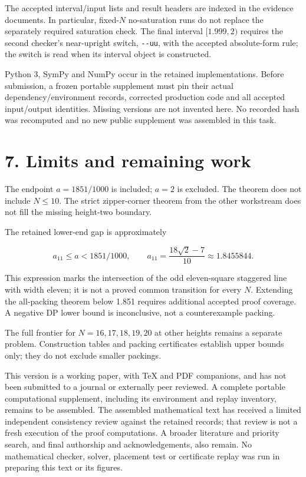 \documentclass[
  11pt,
  a4paper,
]{article}
\begin{document}
The accepted interval/input lists and result headers are indexed in the
evidence documents. In particular, fixed-\(N\) no-saturation runs do not
replace the separately required saturation check. The final interval
\([1.999,2)\) requires the second checker's near-upright switch,
\texttt{-\/-uu}, with the accepted absolute-form rule; the switch is
read when its interval object is constructed.

Python 3, SymPy and NumPy occur in the retained implementations. Before
submission, a frozen portable supplement must pin their actual
dependency/environment records, corrected production code and all
accepted input/output identities. Missing versions are not invented
here. No recorded hash was recomputed and no new public supplement was
assembled in this task.

\section{7. Limits and remaining work}\label{limits-and-remaining-work}

The endpoint \(a=1851/1000\) is included; \(a=2\) is excluded. The
theorem does not include \(N\le10\). The strict zipper-corner theorem
from the other workstream does not fill the missing height-two boundary.

The retained lower-end gap is approximately

\[
a_{11}\le a<1851/1000,\qquad
a_{11}=\frac{18\sqrt2-7}{10}\approx1.8455844.
\]

This expression marks the intersection of the odd eleven-square
staggered line with width eleven; it is not a proved common transition
for every \(N\). Extending the all-packing theorem below 1.851 requires
additional accepted proof coverage. A negative DP lower bound is
inconclusive, not a counterexample packing.

The full frontier for \(N=16,17,18,19,20\) at other heights remains a
separate problem. Construction tables and packing certificates establish
upper bounds only; they do not exclude smaller packings.

This version is a working paper, with TeX and PDF companions, and has
not been submitted to a journal or externally peer reviewed. A complete
portable computational supplement, including its environment and replay
inventory, remains to be assembled. The assembled mathematical text has
received a limited independent consistency review against the retained
records; that review is not a fresh execution of the proof computations.
A broader literature and priority search, and final authorship and
acknowledgements, also remain. No mathematical checker, solver,
placement test or certificate replay was run in preparing this text or
its figures.
\end{document}
